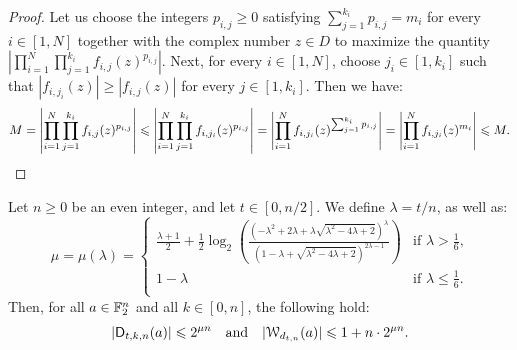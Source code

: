 \documentclass[11pt]{llncs}
\begin{document}
\begin{proof}
    Let us choose the integers $p_{i,j}\geq 0$ satisfying $\sum_{j=1}^{k_i}p_{i,j}=m_i$ for every $i\in[1,N]$ together with the complex number $z\in D$ to maximize the quantity $\left|\prod_{i=1}^N\prod_{j=1}^{k_i}f_{i,j}(z)^{p_{i,j}}\right|$. Next, for every $i\in[1,N]$, choose $j_i\in[1,k_i]$ such that $|f_{i,j_i}(z)|\geq|f_{i,j}(z)|$ for every $j\in[1,k_i]$. Then we have:
    \[
        M=\left|\prod_{i=1}^N\prod_{j=1}^{k_i}f_{i,j}(z)^{p_{i,j}}\right|\leq\left|\prod_{i=1}^N\prod_{j=1}^{k_i}f_{i,j_i}(z)^{p_{i,j}}\right|=\left|\prod_{i=1}^Nf_{i,j_i}(z)^{\sum_{j=1}^{k_i}p_{i,j}}\right|=\left|\prod_{i=1}^Nf_{i,j_i}(z)^{m_i}\right|\leq M.\qedhere
    \]
\end{proof}

\begin{theorem}\label{theorem:bound_D_nka_generalized}
    Let $n\geq 0$ be an even integer, and let $t\in[0,n/2]$. We define $\lambda=t/n$, as well as:
    \[
        \mu=\mu(\lambda)=
        \begin{cases}
            \frac{\lambda+1}{2}+\frac12\log_2\left(\frac{\left(-\lambda^2+2\lambda+\lambda\sqrt{\lambda^2-4\lambda+2}\right)^\lambda}{\left(1-\lambda+\sqrt{\lambda^2-4\lambda+2}\right)^{2\lambda-1}}\right)&\text{if $\lambda>\frac 16$,}\\
            1-\lambda&\text{if $\lambda\leq\frac 16$.}\\
        \end{cases}
    \]
    Then, for all $a\in\F_2^n$ and all $k\in[0,n]$, the following hold:
    \[
        |\Dtkna tkna|\leq 2^{\mu n}\quad \text{and} \quad  |\wt{d_{t,n}}(a)|\leq 1+n\cdot 2^{\mu n}.
    \]
\end{theorem}
\end{document}

